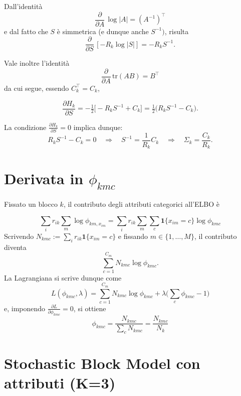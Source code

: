 \documentclass[11pt,a4paper]{article}
\begin{document}

\noindent Dall'identit\`a 
\[
\frac{\partial}{\partial A}\,\log|A| = (A^{-1})^\top
\] e dal fatto che $S$ è simmetrica (e dunque anche $S^{-1})$, risulta
\[
\frac{\partial}{\partial S}\,[-R_k \log|S|] = -R_k S^{-1}.
\]

\noindent Vale inoltre l'identità
\[
\frac{\partial}{\partial A}\,\mathrm{tr}(A B) = B^\top
\]
da cui segue, essendo $C_k^\top=C_k$,

\[
\frac{\partial H_k}{\partial S}
= -\tfrac12\Big[ -R_k S^{-1} + C_k \Big]
= \tfrac12\big(R_k S^{-1} - C_k\big).
\]

\noindent La condizione $\frac{\partial H_k}{\partial S} = 0$ implica dunque:
\[
R_k S^{-1} - C_k = 0
\quad\Longrightarrow\quad
S^{-1} = \frac{1}{R_k}C_k
\quad\Longrightarrow\quad
\Sigma_k = \frac{C_k}{R_k}.
\]

\section{Derivata in $\phi_{kmc}$}

Fissato un blocco $k$, il contributo degli attributi categorici all'ELBO è 

\[ \sum_i  r_{ik} \sum_m \log \phi_{km, x_{im}} = 
\sum_i  r_{ik} \sum_m \sum_c \mathbf{1}\{x_{im}=c\}\log\phi_{kmc}\]
Scrivendo $N_{kmc}:= \sum_i r_{ik}\mathbf{1}\{x_{im} = c\}$ e fissando $m \in \{1,\dots,M\}$, il contributo diventa
\[
\sum_{c=1}^{C_m} N_{kmc}\log\phi_{kmc}.
\]
La Lagrangiana si scrive dunque come 
\[
L(\phi_{kmc},\lambda) = \sum_{c=1}^{C_m} N_{kmc}\log\phi_{kmc} + \lambda\big(\sum_c \phi_{kmc}-1\big)
\]
e, imponendo $\frac{\partial L}{\partial \phi_{kmc}} = 0$, si ottiene
\[\phi_{kmc} = \frac{N_{kmc}}{\sum_c N_{kmc}} = \frac{N_{kmc}}{N_k}\]


\newpage
\section*{Stochastic Block Model con attributi (K=3)}
\end{document}

